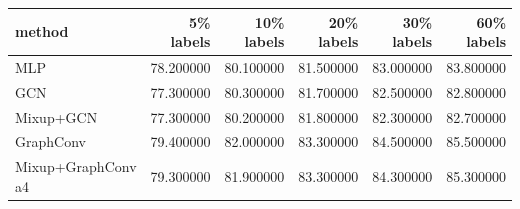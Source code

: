 \begin{tabular}{lrrrrr}
\toprule
method & 5\% labels & 10\% labels & 20\% labels & 30\% labels & 60\% labels \\
\midrule
MLP & 78.200000 & 80.100000 & 81.500000 & 83.000000 & 83.800000 \\
GCN & 77.300000 & 80.300000 & 81.700000 & 82.500000 & 82.800000 \\
Mixup+GCN & 77.300000 & 80.200000 & 81.800000 & 82.300000 & 82.700000 \\
GraphConv & 79.400000 & 82.000000 & 83.300000 & 84.500000 & 85.500000 \\
Mixup+GraphConv a4 & 79.300000 & 81.900000 & 83.300000 & 84.300000 & 85.300000 \\
\bottomrule
\end{tabular}

